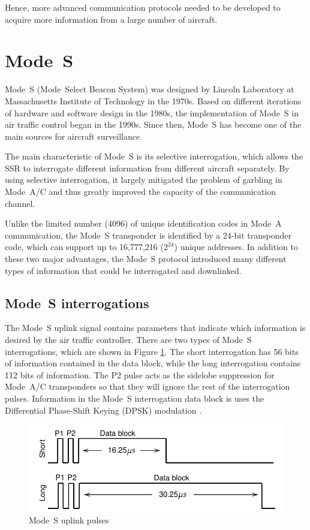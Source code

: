 Hence, more advanced communication protocols needed to be developed to acquire more information from a large number of aircraft.



\section{Mode~S}

Mode~S (Mode~Select Beacon System) was designed by Lincoln Laboratory at Massachusetts Institute of Technology in the 1970s. Based on different iterations of hardware and software design in the 1980s, the implementation of Mode~S in air traffic control began in the 1990s. Since then, Mode~S has become one of the main sources for aircraft surveillance.

The main characteristic of Mode~S is its selective interrogation, which allows the SSR to interrogate different information from different aircraft separately. By using selective interrogation, it largely mitigated the problem of garbling in Mode~A/C and thus greatly improved the capacity of the communication channel.

Unlike the limited number (4096) of unique identification codes in Mode~A communication, the Mode~S transponder is identified by a 24-bit transponder code, which can support up to 16,777,216 ($2^{24}$) unique addresses. In addition to these two major advantages, the Mode~S protocol introduced many different types of information that could be interrogated and downlinked.

\subsection{Mode~S interrogations}
The Mode~S uplink signal contains parameters that indicate which information is desired by the air traffic controller. There are two types of Mode~S interrogations, which are shown in Figure \ref{fig:mode_s_uplink_pulses}. The short interrogation has 56 bits of information contained in the data block, while the long interrogation contains 112 bits of information. The P2 pulse acts as the sidelobe suppression for Mode~A/C transponders so that they will ignore the rest of the interrogation pulses. Information in the Mode~S interrogation data block is uses the Differential Phase-Shift Keying (DPSK) modulation \cite{mazda2014}.

\begin{figure}[ht]
  \includegraphics[scale=0.8]{figures/intro/mode_s_uplink_pulses.pdf}
  \caption{Mode~S uplink pulses}
  \label{fig:mode_s_uplink_pulses}
\end{figure}


